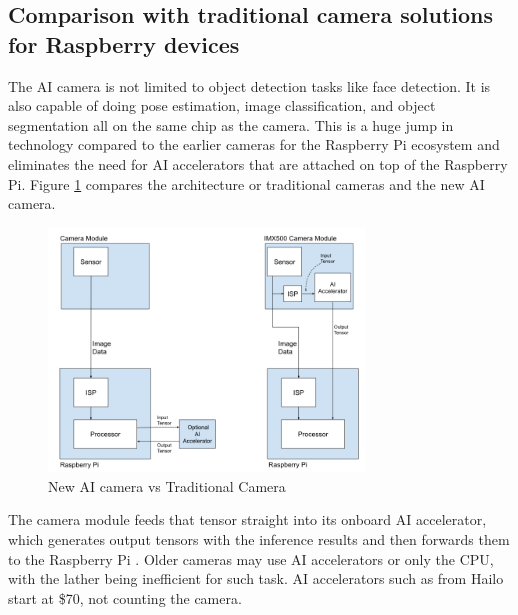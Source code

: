 \subsection{Comparison with traditional camera solutions for Raspberry devices}
The AI camera is not limited to object detection tasks like face detection. It is also capable of doing pose estimation, image classification, and object segmentation all on the same chip as the camera. This is a huge jump in technology compared to the earlier cameras for the Raspberry Pi ecosystem and eliminates the need for AI accelerators that are attached on top of the Raspberry Pi. Figure \ref{fig:ai_cam_comparison} compares the architecture or traditional cameras and the new AI camera. 
\begin{figure}[h] %
	\centering
	\includegraphics[width=0.75\textwidth]{figures/chapter4/ai_cam_comparison.png} %
	\caption{New AI camera vs Traditional Camera}
	\label{fig:ai_cam_comparison}
\end{figure}
The camera module feeds that tensor straight into its onboard AI accelerator, which generates output tensors with the inference results and then forwards them to the Raspberry Pi \cite{raspberrypi_ai_camera_2025}. 
Older cameras may use AI accelerators or only the CPU, with the lather being inefficient for such task. AI accelerators such as from Hailo start at \$70, not counting the camera.
